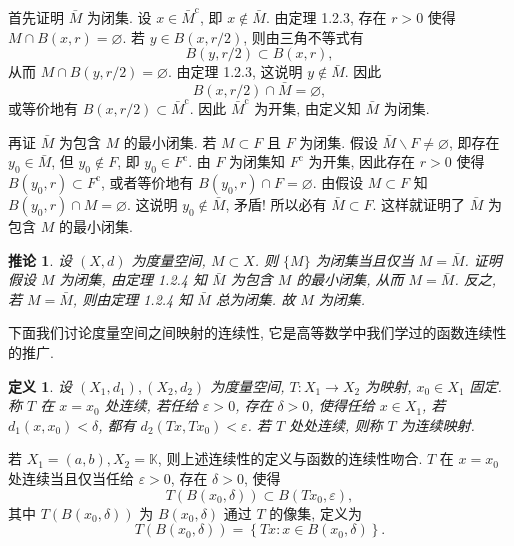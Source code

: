 \documentclass[openany]{ctexbook}
\makeatletter
\theoremstyle{kaiti}
\newtheorem{definition}{定义}[section]
\newtheorem{corollary}{推论}[section]
\theoremstyle{normal}
\renewenvironment{proof}[1][\proofname]{\par
    \pushQED{\qed}%
    \normalfont \topsep6\p@\@plus6\p@\relax
    \trivlist
    \item\relax
    {\heiti #1}\hspace{2\labelsep}\ignorespaces
  }{%
    \popQED\endtrivlist\@endpefalse
  }
\makeatother
\begin{document}
\begin{proof}
首先证明 $\bar{M}$ 为闭集. 设 $x \in \bar{M}^{\mathrm{c}}$, 即 $x \notin \bar{M}$. 由定理 1.2.3, 存在 $r>0$ 使得 $M \cap B(x, r)=\varnothing$. 若 $y \in B(x, r / 2)$, 则由三角不等式有
$$
B(y, r / 2) \subset B(x, r),
$$
从而 $M \cap B(y, r / 2)=\varnothing$. 由定理 1.2.3, 这说明 $y \notin \bar{M}$. 因此
$$
B(x, r / 2) \cap \bar{M}=\varnothing,
$$
或等价地有 $B(x, r / 2) \subset \bar{M}^{\mathrm{c}}$. 因此 $\bar{M}^{\mathrm{c}}$ 为开集, 由定义知 $\bar{M}$ 为闭集.

再证 $\bar{M}$ 为包含 $M$ 的最小闭集. 若 $M \subset F$ 且 $F$ 为闭集. 假设 $\bar{M} \backslash F \neq \varnothing$, 即存在 $y_0 \in \bar{M}$, 但 $y_0 \notin F$, 即 $y_0 \in F^{\mathrm{c}}$. 由 $F$ 为闭集知 $F^{\mathrm{c}}$ 为开集, 因此存在 $r>0$ 使得 $B\left(y_0, r\right) \subset F^{\mathrm{c}}$, 或者等价地有 $B\left(y_0, r\right) \cap F=\varnothing$. 由假设 $M \subset F$ 知 $B\left(y_0, r\right) \cap M=\varnothing$. 这说明 $y_0 \notin \bar{M}$, 矛盾! 所以必有 $\bar{M} \subset F$. 这样就证明了 $\bar{M}$ 为包含 $M$ 的最小闭集.
\end{proof}

\begin{corollary}
  设 $(X, d)$ 为度量空间, $M \subset X$. 则 $\{M\}$ 为闭集当且仅当 $M=\bar{M}$. 证明假设 $M$ 为闭集, 由定理 1.2.4 知 $\bar{M}$ 为包含 $M$ 的最小闭集, 从而 $M=\bar{M}$. 反之, 若 $M=\bar{M}$, 则由定理 1.2.4 知 $\bar{M}$ 总为闭集. 故 $M$ 为闭集.
\end{corollary}

下面我们讨论度量空间之间映射的连续性, 它是高等数学中我们学过的函数连续性的推广.

\begin{definition}
  设 $\left(X_1, d_1\right),\left(X_2, d_2\right)$ 为度量空间, $T: X_1 \rightarrow X_2$ 为映射, $x_0 \in X_1$ 固定. 称 $T$ 在 $x=x_0$ 处连续, 若任给 $\varepsilon>0$, 存在 $\delta>0$, 使得任给 $x \in X_1$, 若 $d_1\left(x, x_0\right)<\delta$, 都有 $d_2\left(T x, T x_0\right)<\varepsilon$. 若 $T$ 处处连续, 则称 $T$ 为连续映射.
\end{definition}

若 $X_1=(a, b), X_2=\mathbb{K}$, 则上述连续性的定义与函数的连续性吻合. $T$ 在 $x=x_0$ 处连续当且仅当任给 $\varepsilon>0$, 存在 $\delta>0$, 使得
$$
T\left(B\left(x_0, \delta\right)\right) \subset B\left(T x_0, \varepsilon\right),
$$
其中 $T\left(B\left(x_0, \delta\right)\right)$ 为 $B\left(x_0, \delta\right)$ 通过 $T$ 的像集, 定义为
$$
T\left(B\left(x_0, \delta\right)\right)=\left\{T x: x \in B\left(x_0, \delta\right)\right\}.
$$
\end{document}
